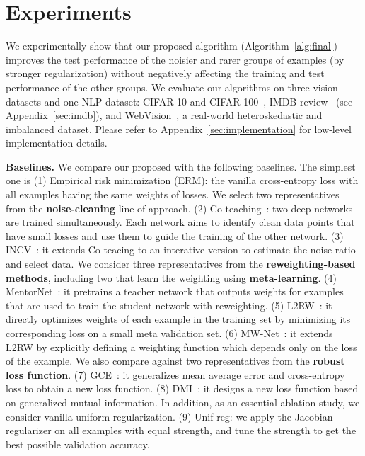 \section{Experiments}
\label{sec:experiments}

We experimentally show that our proposed algorithm \ours (Algorithm~\ref{alg:final}) improves the test performance of the noisier and rarer groups of examples (by stronger regularization) without negatively affecting the training and test performance of the other groups. We evaluate our algorithms on three vision datasets and one NLP dataset: CIFAR-10 and  CIFAR-100~\citep{krizhevsky2009learning}, IMDB-review~\citep{maas2011learning} (see Appendix~\ref{sec:imdb}), and WebVision~\citep{li2017webvision}, a real-world heteroskedastic and imbalanced dataset. Please refer to Appendix~\ref{sec:implementation} for low-level implementation details.

\textbf{Baselines.} We compare our proposed \ours{} with the following baselines. The simplest one is (1) Empirical risk minimization (ERM): the vanilla cross-entropy loss with all examples having the same weights of losses. We select two representatives from the {\bf noise-cleaning} line of approach. (2) Co-teaching~\citep{han2018co}: two deep networks are trained simultaneously. Each network aims to identify clean data points that have small losses and use them to guide the training of the other network. (3) INCV~\citep{chen2019understanding}: it extends Co-teacing to an interative version to estimate the noise ratio and select data. We consider three representatives from the \textbf{reweighting-based methods}, including two that learn the weighting using \textbf{meta-learning}. (4) MentorNet~\citep{jiang2018mentornet}: it pretrains a teacher network that outputs weights for examples that are used to train the student network with reweighting. (5) L2RW~\citep{ren2018learning}: it directly optimizes weights of each example in the training set by minimizing its corresponding loss on a small meta validation set. (6) MW-Net~\citep{shu2019meta}: it extends L2RW by explicitly defining a weighting function which depends only on the loss of the example. We also compare against two representatives from the \textbf{robust loss function}. (7) GCE~\citep{zhang2018generalized}: it generalizes mean average error and cross-entropy loss to obtain a new loss function. (8) DMI~\citep{xu2019l_dmi}: it designs a new loss function based on generalized mutual information. In addition, as an essential ablation study, we consider vanilla uniform regularization.
(9) Unif-reg: we apply the Jacobian regularizer on all examples with equal strength, and tune the strength to get the best possible validation accuracy.

